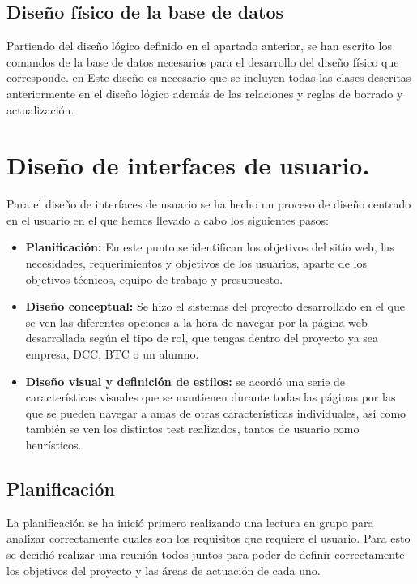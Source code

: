 \documentclass[pdftex,11pt,a4paper]{book}
\begin{document}
\section{Diseño físico de la base de datos}

Partiendo del diseño lógico definido en el apartado anterior, se han escrito los comandos de la base de datos necesarios para el desarrollo del diseño físico que corresponde. en Este diseño es necesario que se incluyen todas las clases descritas anteriormente en el diseño lógico además de las relaciones y reglas de borrado y actualización.



\chapter{Diseño de interfaces de usuario.}

Para el diseño de interfaces de usuario se ha hecho un proceso de diseño centrado en el usuario en el que hemos llevado a cabo los siguientes pasos:
\begin{itemize}
\item \textbf{Planificación:} En este punto se identifican los objetivos del sitio web, las necesidades, requerimientos y objetivos de los usuarios, aparte de los objetivos técnicos, equipo de trabajo y presupuesto.

\item \textbf{Diseño conceptual:} Se hizo el sistemas del proyecto desarrollado en el que se ven las diferentes opciones a la hora de navegar por la página web desarrollada según el tipo de rol, que tengas dentro del proyecto ya sea empresa, DCC, BTC o un alumno.

\item \textbf{Diseño visual y definición de estilos:} se acordó una serie de características visuales que se mantienen durante todas las páginas por las que se pueden navegar a amas de otras características individuales, así como también se ven los distintos test realizados, tantos de usuario como heurísticos.

\end{itemize}

\section{Planificación}
La planificación se ha inició primero realizando una lectura en grupo para analizar correctamente cuales son los requisitos que requiere el usuario. Para esto se decidió realizar una reunión todos juntos para poder de definir correctamente los objetivos del proyecto y las áreas de actuación de cada uno.
\end{document}
